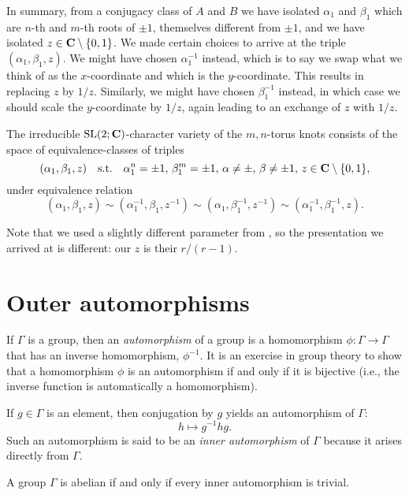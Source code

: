 \documentclass[11pt, oneside, usenames, dvipsnames, svgnames, table, draft]{amsart}
\begin{document}
\begin{example}
  In summary, from a conjugacy class of $A$ and $B$ we have isolated $\alpha_1$ and $\beta_1$ which are $n$-th and
  $m$-th roots of $\pm 1$, themselves different from $\pm 1$, and we have isolated $z \in \mathbf{C} \setminus \{0,1\}$. We made
  certain choices to arrive at the triple $(\alpha_1, \beta_1, z )$. We might have chosen $\alpha_1^{-1}$ instead, which
  is to say we  swap what we think of as the $x$-coordinate and which is the $y$-coordinate. This results in replacing
  $z$ by $1/z$. Similarly, we might have chosen $\beta_1^{-1}$ instead, in which case we should scale the $y$-coordinate
  by $1/z$, again leading to an exchange of $z$ with $1/z$.

  The irreducible $\operatorname{SL}(2;\mathbf{C})$-character variety of the $m,n$-torus knots consists of the space of equivalence-classes of
  triples
  \[ (\alpha_1, \beta_1, z) \quad \text{s.t.} \quad\alpha_1^n = \pm 1, \, \beta_1^m = \pm 1, \, \alpha \neq \pm, \, \beta
    \neq \pm 1, \, z \in \mathbf{C} \setminus \{0,1\}, \]
  under equivalence relation
  \[ (\alpha_1, \beta_1, z)  \sim (\alpha_1^{-1}, \beta_1, z^{-1}) \sim (\alpha_1, \beta_1^{-1}, z^{-1})  \sim
    (\alpha_1^{-1}, \beta_1^{-1}, z).\]

  Note that we used a slightly different parameter from \cite{Munoz2009}, so the presentation we arrived at is
  different: our $z$ is their $r/(r-1)$.
\end{example}


\section{Outer automorphisms}
\label{sec:outer-automorphisms}

If $\Gamma$ is a group, then an \emph{automorphism} of a group is a homomorphism $\phi: \Gamma \to \Gamma$ that has an
inverse homomorphism, $\phi^{-1}$. It is an exercise in group theory to show that a homomorphism $\phi$ is an automorphism if and only
if it is bijective (i.e., the inverse function is automatically a homomorphism).

If $g \in \Gamma$ is an element, then conjugation by $g$ yields an automorphism of $\Gamma$:
\[ h \mapsto g^{-1} h g. \]
Such an automorphism is said to be an \emph{inner automorphism} of $\Gamma$ because it arises directly from $\Gamma$.

\begin{remark}
  A group $\Gamma$ is abelian if and only if every inner automorphism is trivial.
\end{remark}
\end{document}

